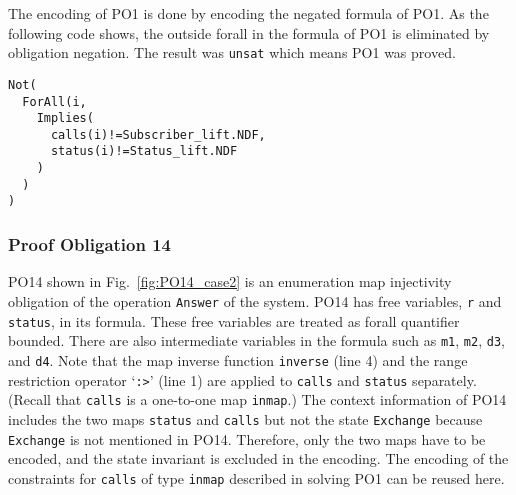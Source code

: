 The encoding of PO1 is done by encoding the negated formula of PO1. As the following code shows, the outside forall in the formula of PO1 is eliminated by obligation negation. The result was {\tt unsat} which means PO1 was proved.



\begin{mdframed}[roundcorner=5pt,shadow=true]
\begin{Verbatim}[fontsize=\small]
Not(
  ForAll(i,
    Implies(
      calls(i)!=Subscriber_lift.NDF,
      status(i)!=Status_lift.NDF
    )
  )
)
\end{Verbatim}
\end{mdframed}


\subsubsection{Proof Obligation 14}

PO14 shown in Fig.~\ref{fig:PO14_case2} is an enumeration map injectivity obligation of the operation {\tt Answer} of the system. PO14 has free variables, {\tt r} and {\tt status}, in its formula. These free variables are treated as forall quantifier bounded. There are also intermediate variables in the formula such as {\tt m1}, {\tt m2}, {\tt d3}, and {\tt d4}. Note that the map inverse function {\tt inverse} (line 4) and the range restriction operator `{\tt :>}' (line 1) are applied to {\tt calls} and {\tt status} separately. (Recall that {\tt calls} is a one-to-one map {\tt inmap}.) The context information of PO14 includes the two maps {\tt status} and {\tt calls} but not the state {\tt Exchange} because {\tt Exchange} is not mentioned in PO14. Therefore, only the two maps have to be encoded, and the state invariant is excluded in the encoding. The encoding of the constraints for {\tt calls} of type {\tt inmap} described in solving PO1 can be reused here.

